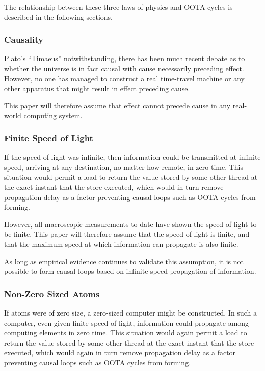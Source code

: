 \documentclass[10]{article}
\begin{document}
The relationship between these three laws of physics and OOTA
cycles is described in the following sections.

\subsubsection{Causality}
\label{sec:Causality}

Plato's ``Timaeus'' notwithstanding, there has been much recent debate
as to whether the universe is in fact causal with cause necessarily
preceding effect.
However, no one has managed to construct a real time-travel machine
or any other apparatus that might result in effect preceding cause.

This paper will therefore assume that effect cannot precede cause in
any real-world computing system.

\subsubsection{Finite Speed of Light}
\label{sec:Finite Speed of Light}

If the speed of light was infinite, then information could be transmitted
at infinite speed, arriving at any destination, no matter how remote,
in zero time.
This situation would permit a load to return the value stored by some
other thread at the exact instant that the store executed, which
would in turn remove propagation delay as a factor preventing
causal loops such as OOTA cycles from forming.

However, all macroscopic measurements to date have shown the speed of
light to be finite.
This paper will therefore assume that the speed of light is finite, and
that the maximum speed at which information can propagate is also finite.

As long as empirical evidence continues to validate this assumption, it
is not possible to form causal loops based on infinite-speed propagation
of information.

\subsubsection{Non-Zero Sized Atoms}
\label{sec:Non-Zero Sized Atoms}

If atoms were of zero size, a zero-sized computer might be constructed.
In such a computer, even given finite speed of light, information could
propagate among computing elements in zero time.
This situation would again permit a load to return the value stored by
some other thread at the exact instant that the store executed, which
would again in turn remove propagation delay as a factor preventing
causal loops such as OOTA cycles from forming.
\end{document}
